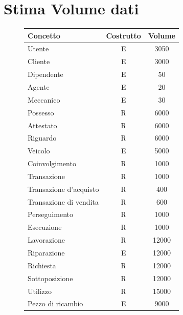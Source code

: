 \documentclass[a4paper,12pt]{report}
\begin{document}
\section{Stima Volume dati}
\begin{figure}[H]
	\fontsize{14pt}{12pt}\selectfont
	\advance\leftskip-15cm
	\centering
	\begin{tabular}{l c c }
		\rowcolor{BlueGreen}
		\rule[-3mm]{0mm}{0.85cm}
		\textbf{Concetto} & \textbf{Costrutto} &\textbf{Volume} \\
		\hline\rule[-2mm]{0mm}{0.75cm}
		Utente & E & 3050\\
		\hline\rule[-2mm]{0mm}{0.75cm}
		Cliente & E & 3000 \\
		\hline\rule[-2mm]{0mm}{0.75cm}
		Dipendente & E & 50\\
		\hline\rule[-2mm]{0mm}{0.75cm}
		Agente & E & 20\\
		\hline\rule[-2mm]{0mm}{0.75cm}
		Meccanico & E & 30\\
		\hline\rule[-2mm]{0mm}{0.75cm}
		Possesso & R & 6000 \\
		\hline\rule[-2mm]{0mm}{0.75cm}
		Attestato & R & 6000\\
		\hline\rule[-2mm]{0mm}{0.75cm}
		Riguardo & R & 6000 \\
		\hline\rule[-2mm]{0mm}{0.75cm}
		Veicolo & E & 5000 \\
		\hline\rule[-2mm]{0mm}{0.75cm}
		Coinvolgimento & R & 1000\\
		\hline\rule[-2mm]{0mm}{0.75cm}
		Transazione & R & 1000\\
		\hline\rule[-2mm]{0mm}{0.75cm}
		Transazione d'acquisto& R & 400\\
		\hline\rule[-2mm]{0mm}{0.75cm}
		Transazione di vendita& R & 600\\
		\hline\rule[-2mm]{0mm}{0.75cm}
		Perseguimento & R & 1000\\
		\hline\rule[-2mm]{0mm}{0.75cm}
		Esecuzione & R & 1000\\
		\hline\rule[-2mm]{0mm}{0.75cm}
		Lavorazione & R & 12000\\
		\hline\rule[-2mm]{0mm}{0.75cm}
		Riparazione & E & 12000\\
		\hline\rule[-2mm]{0mm}{0.75cm}
		Richiesta & R & 12000\\
		\hline\rule[-2mm]{0mm}{0.75cm}
		Sottoposizione & R & 12000\\
		\hline\rule[-2mm]{0mm}{0.75cm}
		Utilizzo & R & 15000\\
		\hline\rule[-2mm]{0mm}{0.75cm}
		Pezzo di ricambio & E &  9000\\
		\hline
	\end{tabular}
\end{figure}
\end{document}
